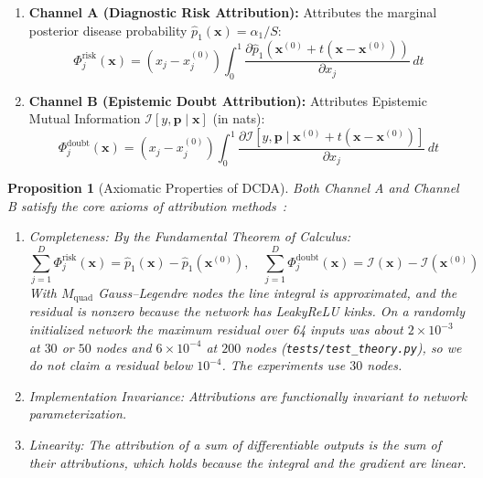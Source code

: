 \documentclass[3p,12pt]{elsarticle}
\theoremstyle{plain}
\newtheorem{proposition}[theorem]{Proposition}
\theoremstyle{definition}
\begin{document}
\begin{enumerate}
    \item \textbf{Channel A (Diagnostic Risk Attribution):} Attributes the marginal posterior disease probability $\hat{p}_1(\mathbf{x}) = \alpha_1 / S$:
    \begin{equation}
        \Phi_{j}^{\text{risk}}(\mathbf{x}) = \left(x_j - x^{(0)}_j\right) \int_0^1 \frac{\partial \hat{p}_1\left(\mathbf{x}^{(0)} + t (\mathbf{x} - \mathbf{x}^{(0)})\right)}{\partial x_j} \, dt
    \end{equation}
    \item \textbf{Channel B (Epistemic Doubt Attribution):} Attributes Epistemic Mutual Information $\mathcal{I}[y, \mathbf{p} \mid \mathbf{x}]$ (in nats):
    \begin{equation}
        \Phi_{j}^{\text{doubt}}(\mathbf{x}) = \left(x_j - x^{(0)}_j\right) \int_0^1 \frac{\partial \mathcal{I}\left[y, \mathbf{p} \mid \mathbf{x}^{(0)} + t (\mathbf{x} - \mathbf{x}^{(0)})\right]}{\partial x_j} \, dt
    \end{equation}
\end{enumerate}

\begin{proposition}[Axiomatic Properties of DCDA]
\label{prop:dcda_axioms}
Both Channel A and Channel B satisfy the core axioms of attribution methods~\cite{sundararajan2017axiomatic}:
\begin{enumerate}
    \item \emph{Completeness:} By the Fundamental Theorem of Calculus:
    \begin{equation}
        \sum_{j=1}^D \Phi_{j}^{\text{risk}}(\mathbf{x}) = \hat{p}_1(\mathbf{x}) - \hat{p}_1\left(\mathbf{x}^{(0)}\right), \quad \sum_{j=1}^D \Phi_{j}^{\text{doubt}}(\mathbf{x}) = \mathcal{I}(\mathbf{x}) - \mathcal{I}\left(\mathbf{x}^{(0)}\right)
    \end{equation}
    With $M_{\text{quad}}$ Gauss--Legendre nodes the line integral is approximated, and the residual is nonzero because the network has LeakyReLU kinks. On a randomly initialized network the maximum residual over 64 inputs was about $2\times 10^{-3}$ at $30$ or $50$ nodes and $6\times 10^{-4}$ at $200$ nodes (\texttt{tests/test\_theory.py}), so we do not claim a residual below $10^{-4}$. The experiments use $30$ nodes.
    \item \emph{Implementation Invariance:} Attributions are functionally invariant to network parameterization.
    \item \emph{Linearity:} The attribution of a sum of differentiable outputs is the sum of their attributions, which holds because the integral and the gradient are linear.
\end{enumerate}
\end{proposition}
\end{document}
